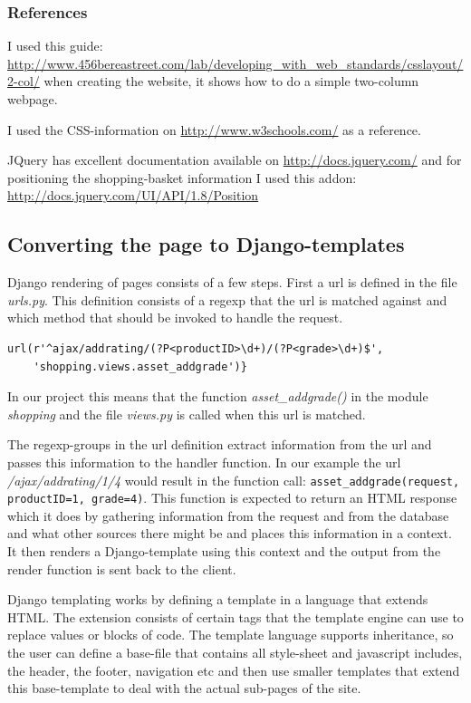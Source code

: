 \documentclass[12pt, a4paper,titlepage]{article}
\begin{document}
\subsubsection{References}
I used this guide:
\url{http://www.456bereastreet.com/lab/developing_with_web_standards/csslayout/2-col/}
when creating the website, it shows how to do a simple two-column webpage.

I used the CSS-information on \url{http://www.w3schools.com/} as a reference.

JQuery has excellent documentation available on \url{http://docs.jquery.com/}
and for positioning the shopping-basket information I used this addon: 
\url{http://docs.jquery.com/UI/API/1.8/Position}

\subsection{Converting the page to Django-templates}

Django rendering of pages consists of a few steps. First a url is defined in the
file \emph{urls.py}. This definition consists of a regexp that the url is matched
against and which method that should be invoked to handle the request.
\lstset{numbers=none}
\begin{lstlisting}
url(r'^ajax/addrating/(?P<productID>\d+)/(?P<grade>\d+)$',
	'shopping.views.asset_addgrade')}
\end{lstlisting}
\lstset{numbers=left}
In our project this means that the function \emph{asset\_addgrade()} in the module \emph{shopping} and the file \emph{views.py} is called when this url
is matched.

The regexp-groups in the url definition extract information from the url
and passes this information to the handler function. In our example the url
\emph{/ajax/addrating/1/4} would result in the function call:
\lstinline{asset_addgrade(request, productID=1, grade=4)}.
This function is expected to return an HTML response which it does
by gathering information from the request and from the database and what
other sources there might be and places this information in a context. 
It then renders a Django-template using this context and the output from the
render function is sent back to the client.

Django templating works by defining a template in a language that extends
HTML. The extension consists of certain tags that the template engine can
use to replace values or blocks of code. The template language supports
inheritance, so the user can define a base-file that contains all style-sheet and
javascript includes, the header, the footer, navigation etc and then use smaller
templates that extend this base-template to deal with the actual sub-pages of
the site.
\end{document}
